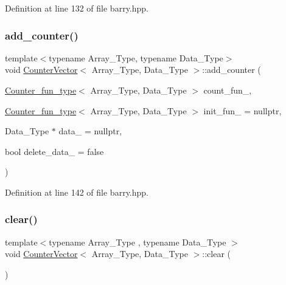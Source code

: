 Definition at line 132 of file barry.\+hpp.

\mbox{\label{classbarry_1_1_counter_vector_adb32ff1af45bc05a292a5cb064dc414d}} 
\subsubsection{\texorpdfstring{add\+\_\+counter()}{add\_counter()}\hspace{0.1cm}{\footnotesize\ttfamily [3/3]}}
{\footnotesize\ttfamily template$<$typename Array\+\_\+\+Type, typename Data\+\_\+\+Type$>$ \\
void \hyperlink{classbarry_1_1_counter_vector}{Counter\+Vector}$<$ Array\+\_\+\+Type, Data\+\_\+\+Type $>$\+::add\+\_\+counter (\begin{DoxyParamCaption}\item[{\hyperlink{namespacebarry_abaaae3200da8e4b7faac3c04fe9c3081}{Counter\+\_\+fun\+\_\+type}$<$ Array\+\_\+\+Type, Data\+\_\+\+Type $>$}]{count\+\_\+fun\+\_\+,  }\item[{\hyperlink{namespacebarry_abaaae3200da8e4b7faac3c04fe9c3081}{Counter\+\_\+fun\+\_\+type}$<$ Array\+\_\+\+Type, Data\+\_\+\+Type $>$}]{init\+\_\+fun\+\_\+ = {\ttfamily nullptr},  }\item[{Data\+\_\+\+Type $\ast$}]{data\+\_\+ = {\ttfamily nullptr},  }\item[{bool}]{delete\+\_\+data\+\_\+ = {\ttfamily false} }\end{DoxyParamCaption})\hspace{0.3cm}{\ttfamily [inline]}}



Definition at line 142 of file barry.\+hpp.

\mbox{\label{classbarry_1_1_counter_vector_acce75748f917e3a7898d49a23df996e7}} 
\subsubsection{\texorpdfstring{clear()}{clear()}}
{\footnotesize\ttfamily template$<$typename Array\+\_\+\+Type , typename Data\+\_\+\+Type $>$ \\
void \hyperlink{classbarry_1_1_counter_vector}{Counter\+Vector}$<$ Array\+\_\+\+Type, Data\+\_\+\+Type $>$\+::clear (\begin{DoxyParamCaption}{ }\end{DoxyParamCaption})\hspace{0.3cm}{\ttfamily [inline]}}



